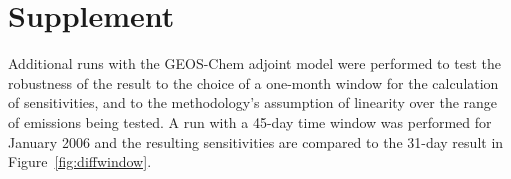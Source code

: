 \section{Supplement}

Additional runs with the GEOS-Chem adjoint model were performed to test the robustness of the result to the choice of a one-month window for the calculation of sensitivities, and to the methodology's assumption of linearity over the range of emissions being tested. A run with a 45-day time window was performed for January 2006 and the resulting sensitivities are compared to the 31-day result in Figure~\ref{fig:diffwindow}.
